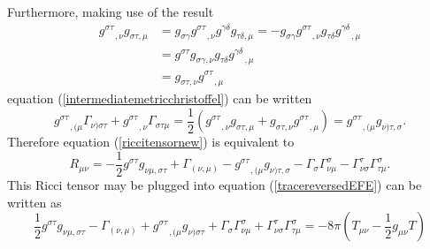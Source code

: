 \documentclass[11pt]{article}
\newcommand{\blank}{\enspace}
\newcommand{\blankt}{\text{ }}
\numberwithin{equation}{section}
\begin{document}
Furthermore, making use of the result
\begin{equation}
    \begin{split}
        g^{\sigma\tau}_{\blank\blankt,\nu}g_{\sigma\tau,\mu} &= g_{\sigma\gamma}g^{\sigma\tau}_{\blank\blankt,\nu}g^{\gamma\delta}g_{\tau\delta,\mu} = -g_{\sigma\gamma}g^{\sigma\tau}_{\blank\blankt,\nu}g_{\tau\delta}g^{\gamma\delta}_{\blank\blankt,\mu} \\
        &= g^{\sigma\tau}g_{\sigma\gamma,\nu}g_{\tau\delta}g^{\gamma\delta}_{\blank\blankt,\mu} \\ 
        &= g_{\sigma\tau,\nu}g^{\sigma\tau}_{\blank\blankt,\mu}
    \end{split}
\end{equation}
equation (\ref{intermediatemetricchristoffel}) can be written
\begin{equation}
    g^{\sigma\tau}_{\blank\blankt,(\mu}\Gamma^{\phantom{\sigma\tau}}_{\nu)\sigma\tau} + g^{\sigma\tau}_{\blank\blankt,\nu}\Gamma_{\sigma\tau\mu} = \frac12( g^{\sigma\tau}_{\blank\blankt,\nu}g_{\sigma\tau,\mu}+ g_{\sigma\tau,\nu}g^{\sigma\tau}_{\blank\blankt,\mu}) = g^{\sigma\tau}_{\blank\blankt,(\mu}g^{\phantom{\sigma\tau}}_{\nu)\tau,\sigma}.
\end{equation}
Therefore equation (\ref{riccitensornew}) is equivalent to
\begin{equation}
    R_{\mu\nu} = -\frac12g^{\sigma\tau}g_{\nu\mu,\sigma\tau} + \Gamma_{(\nu,\mu)} - g^{\sigma\tau}_{\blank\blankt,(\mu}g^{\phantom{\sigma\tau}}_{\nu)\tau,\sigma} - \Gamma_{\sigma}\Gamma^{\sigma}_{\nu\mu} - \Gamma^{\tau}_{\nu\sigma}\Gamma^{\sigma}_{\tau\mu}.
\end{equation}
This Ricci tensor may be plugged into equation (\ref{tracereversedEFE}) can be written as
\begin{equation}\label{GHGevolutioneqbefore}
    \frac12g^{\sigma\tau}g_{\nu\mu,\sigma\tau} - \Gamma_{(\nu,\mu)} + g^{\sigma\tau}_{\blank\blankt,(\mu}g^{\phantom{\sigma\tau}}_{\nu)\sigma\tau} + \Gamma_{\sigma}\Gamma^{\sigma}_{\nu\mu} + \Gamma^{\tau}_{\nu\sigma}\Gamma^{\sigma}_{\tau\mu} = -8\pi\left(T_{\mu\nu} - \frac12g_{\mu\nu}T\right)
\end{equation}
\end{document}
